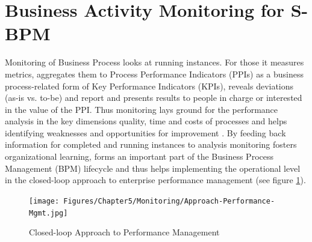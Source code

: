 \section{Business Activity Monitoring for S-BPM}\label{sec:BAMinSubjectOrientation}

Monitoring of Business Process looks at running instances. For those it measures metrics, aggregates them to Process Performance Indicators (PPIs) as a business process-related form of Key Performance Indicators (KPIs), reveals deviations (as-is vs. to-be) and report and presents results to people in charge or interested in the value of the PPI. Thus monitoring lays ground for the performance analysis in the key dimensions quality, time and costs of processes and helps identifying weaknesses and opportunities for improvement \cite{book:UntPerform}.
By feeding back information for completed and running instances to analysis monitoring fosters organizational learning, forms an important part of the Business Process Management (BPM) lifecycle \cite{article:SUbjetorientiertBPM} and thus helps implementing the operational level in the closed-loop approach to enterprise performance management \cite{book:processmonitoring} (see figure \ref{fig:Approach-Performance}).
\\


\begin{figure}[htbp]
	\centering
	\texttt{[image: Figures/Chapter5/Monitoring/Approach-Performance-Mgmt.jpg]}
	\caption[Closed-loop Approach to Performance Management]{Closed-loop Approach to Performance Management \cite{book:AnalytInfSys}}
	\label{fig:Approach-Performance}
\end{figure}



